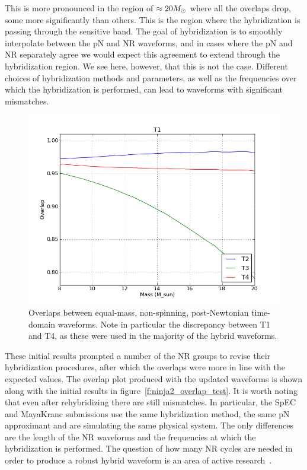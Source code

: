 This is more pronounced in the region of $\approx 20 M_\odot$ where all
the overlaps drop, some more significantly than others.  This is the
region where the hybridization is passing through the sensitive band.
The goal of hybridization is to smoothly interpolate between the pN
and NR waveforms, and in cases where the pN and NR separately agree we
would expect this agreement to extend through the hybridization
region.  We see here, however, that this is not the case.  Different
choices of hybridization methods and parameters, as well as the
frequencies over which the hybridization is performed, can lead to
waveforms with significant mismatches.  

\begin{figure}
  \includegraphics[width=\linewidth]{figures/ninja2/pn_figure03}
  \caption[Overlaps between pN waveforms as a function of mass]{
  \label{f:pn_overlaps}
Overlaps between equal-mass, non-spinning, post-Newtonian time-domain 
waveforms.  Note in particular the discrepancy between T1 and T4, as
these were used in the majority of the hybrid waveforms.
}
\end{figure}%


These initial results prompted a number of the NR groups to revise
their hybridization procedures, after which the overlaps were more in
line with the expected values.  The overlap plot produced with the
updated waveforms is shown along with the initial results in
figure~\ref{f:ninja2_overlap_test}.  It is worth noting that even
after rehybridizing there are still mismatches.  In particular, the
SpEC and MayaKranc submissions use the same hybridization method, the
same pN approximant and are simulating the same physical system.  The
only differences are the length of the NR waveforms and the
frequencies at which the hybridization is performed.  The question of
how many NR cycles are needed in order to produce a robust hybrid
waveform is an area of active research~\cite{MacDonald:2011}. 

